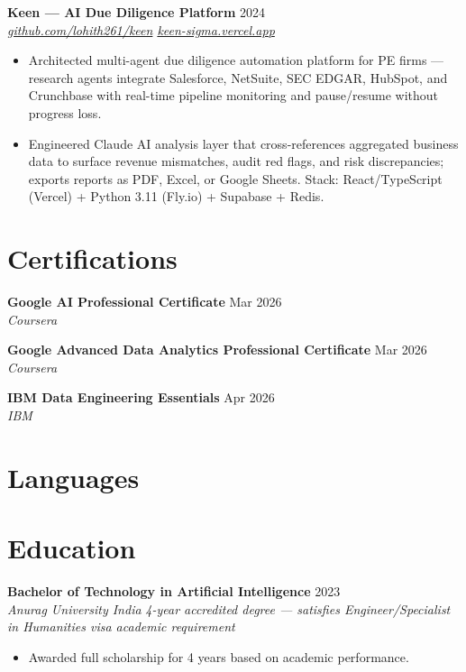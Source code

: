 \documentclass[10pt,letterpaper]{article}
\newcommand{\entry}[3]{%
  \vspace{3pt}\textbf{#1} \hfill #3 \\
  \textit{\small #2}\vspace{1pt}}
\begin{document}
\entry{Keen --- AI Due Diligence Platform}{\href{https://github.com/lohith261/keen}{github.com/lohith261/keen} \quad\textbullet\quad \href{https://keen-sigma.vercel.app/}{keen-sigma.vercel.app}}{2024}
\begin{itemize}
  \item Architected multi-agent due diligence automation platform for PE firms --- research agents integrate Salesforce, NetSuite, SEC EDGAR, HubSpot, and Crunchbase with real-time pipeline monitoring and pause/resume without progress loss.
  \item Engineered Claude AI analysis layer that cross-references aggregated business data to surface revenue mismatches, audit red flags, and risk discrepancies; exports reports as PDF, Excel, or Google Sheets. Stack: React/TypeScript (Vercel) + Python 3.11 (Fly.io) + Supabase + Redis.
\end{itemize}

\section{Certifications}

\textbf{Google AI Professional Certificate} \hfill Mar 2026 \\
\textit{Coursera}

\textbf{Google Advanced Data Analytics Professional Certificate} \hfill Mar 2026 \\
\textit{Coursera}

\textbf{IBM Data Engineering Essentials} \hfill Apr 2026 \\
\textit{IBM}

\section{Languages}


\section{Education}

\entry{Bachelor of Technology in Artificial Intelligence}{Anurag University \textbullet{} India}{2023}
\newline\textit{\small 4-year accredited degree --- satisfies Engineer/Specialist in Humanities visa academic requirement}
\begin{itemize}
  \item Awarded full scholarship for 4 years based on academic performance.
\end{itemize}
\end{document}
